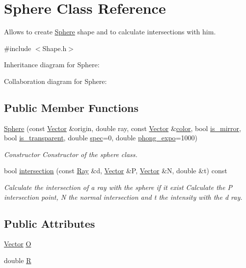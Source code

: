 \hypertarget{classSphere}{}\section{Sphere Class Reference}
\label{classSphere}


Allows to create \hyperlink{classSphere}{Sphere} shape and to calculate intersections with him.  




{\ttfamily \#include $<$Shape.\+h$>$}



Inheritance diagram for Sphere\+:


Collaboration diagram for Sphere\+:
\subsection*{Public Member Functions}
\begin{DoxyCompactItemize}
\item 
\hyperlink{classSphere_afe0be46169fd4012f7f5bfe791f8f8c6}{Sphere} (const \hyperlink{classVector}{Vector} \&origin, double ray, const \hyperlink{classVector}{Vector} \&\hyperlink{classShape_adb97857c268315aed7861e5204c2485b}{color}, bool \hyperlink{classShape_a0ead7657fa5e4c7862fe1cedd670a9e5}{is\+\_\+mirror}, bool \hyperlink{classShape_ab8da3fc4606e66dea941ec23d25f53ef}{is\+\_\+transparent}, double \hyperlink{classShape_a60ef96ac5dea3478fdd1ab320e4c3bef}{spec}=0, double \hyperlink{classShape_a2556fca106f9503e6dfb4da703c28f7f}{phong\+\_\+expo}=1000)
\begin{DoxyCompactList}\small\item\em Constructor Constructor of the sphere class. \end{DoxyCompactList}\item 
bool \hyperlink{classSphere_acbd56a4021638361d354e21d68f98e62}{intersection} (const \hyperlink{classRay}{Ray} \&d, \hyperlink{classVector}{Vector} \&P, \hyperlink{classVector}{Vector} \&N, double \&t) const
\begin{DoxyCompactList}\small\item\em Calculate the intersection of a ray with the sphere if it exist Calculate the P intersection point, N the normal intersection and t the intensity with the d ray. \end{DoxyCompactList}\end{DoxyCompactItemize}
\subsection*{Public Attributes}
\begin{DoxyCompactItemize}
\item 
\hyperlink{classVector}{Vector} \hyperlink{classSphere_a5b1afbcb994e9fd1b369ee4897af94af}{O}
\item 
double \hyperlink{classSphere_ae63beb5380ccbbb9ba820c54d03d02ef}{R}
\end{DoxyCompactItemize}


